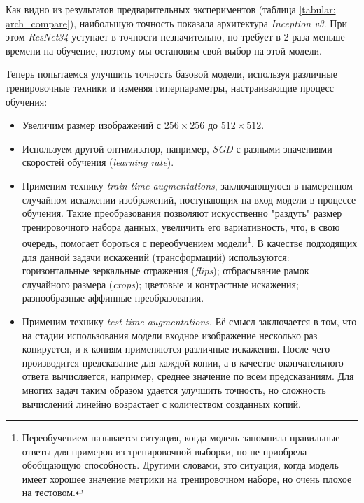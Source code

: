 \indent
\indent
Как видно из результатов предварительных экспериментов
(таблица \ref{tabular: arch_compare}), наибольшую
точность показала архитектура \textit{Inception v3}. При этом 
\textit{ResNet34} уступает в точности незначительно, но требует
в 2 раза меньше времени на обучение, поэтому мы остановим свой
выбор на этой модели. 


\indent
\indent
Теперь попытаемся улучшить точность базовой модели,
используя различные тренировочные техники и изменяя гиперпараметры,
настраивающие процесс обучения:

\begin{itemize}

    \item Увеличим размер изображений с $256 \times 256 $ до $512 \times 512$.
    
    \item Используем другой оптимизатор, например, \textit{SGD} с 
    разными значениями скоростей обучения (\textit{learning rate}).
    
    \item Применим технику \textit{train time augmentations}, заключающуюся
    в намеренном случайном искажении изображений, поступающих на вход модели 
    в процессе обучения. Такие преобразования позволяют искусственно
    "раздуть" размер тренировочного набора данных, увеличить его 
    вариативность, что, в свою очередь, помогает бороться с переобучением
    модели\footnote{Переобучением называется ситуация, когда модель
    запомнила правильные ответы для примеров из тренировочной выборки,
    но не приобрела обобщающую способность. Другими словами, это ситуация,
    когда модель имеет хорошее значение метрики на тренировочном наборе,
    но очень плохое на тестовом.}.
    В качестве подходящих для данной задачи
    искажений (трансформаций) используются:
    горизонтальные зеркальные отражения (\textit{flips});
    отбрасывание рамок случайного размера (\textit{crops});
    цветовые и контрастные искажения;
    разнообразные аффинные преобразования.
    
    \item Применим технику \textit{test time augmentations}. 
    Её смысл заключается в том, что на стадии использования модели
    входное изображение
    несколько раз копируется, и к копиям применяются различные 
    искажения. После чего производится предсказание для каждой
    копии, а в качестве окончательного ответа вычисляется, например, 
    среднее значение по всем предсказаниям. Для многих задач таким образом
    удается улучшить точность, но сложность вычислений линейно возрастает
    с количеством созданных копий.

\end{itemize}


